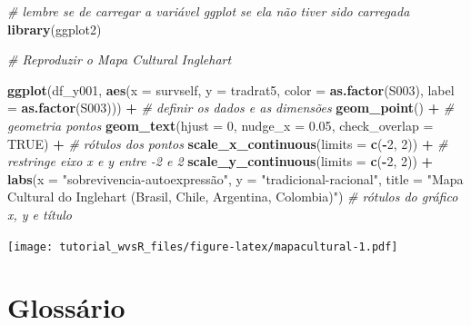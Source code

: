 \documentclass[
  10pt,
  brazil,
  a4paper,
  twoside, notitlepage, openright]{book}
\newenvironment{Shaded}{\begin{snugshade}}{\end{snugshade}}
\newcommand{\CommentTok}[1]{\textcolor[rgb]{0.56,0.35,0.01}{\textit{#1}}}
\newcommand{\DataTypeTok}[1]{\textcolor[rgb]{0.13,0.29,0.53}{#1}}
\newcommand{\DecValTok}[1]{\textcolor[rgb]{0.00,0.00,0.81}{#1}}
\newcommand{\FloatTok}[1]{\textcolor[rgb]{0.00,0.00,0.81}{#1}}
\newcommand{\KeywordTok}[1]{\textcolor[rgb]{0.13,0.29,0.53}{\textbf{#1}}}
\newcommand{\NormalTok}[1]{#1}
\newcommand{\OperatorTok}[1]{\textcolor[rgb]{0.81,0.36,0.00}{\textbf{#1}}}
\newcommand{\OtherTok}[1]{\textcolor[rgb]{0.56,0.35,0.01}{#1}}
\newcommand{\StringTok}[1]{\textcolor[rgb]{0.31,0.60,0.02}{#1}}
\begin{document}
\begin{Shaded}
\begin{Highlighting}[]
\CommentTok{# lembre se de carregar a variável ggplot se ela não tiver sido carregada }
\KeywordTok{library}\NormalTok{(ggplot2)}

\CommentTok{# Reproduzir o Mapa Cultural Inglehart}

\KeywordTok{ggplot}\NormalTok{(df_y001, }\KeywordTok{aes}\NormalTok{(}\DataTypeTok{x =}\NormalTok{ survself, }
                    \DataTypeTok{y =}\NormalTok{ tradrat5, }
                    \DataTypeTok{color =} \KeywordTok{as.factor}\NormalTok{(S003), }
                    \DataTypeTok{label =} \KeywordTok{as.factor}\NormalTok{(S003))) }\OperatorTok{+}\StringTok{ }
\StringTok{  }\CommentTok{# definir os dados e as dimensões}
\StringTok{  }\KeywordTok{geom_point}\NormalTok{() }\OperatorTok{+}\StringTok{ }\CommentTok{# geometria pontos}
\StringTok{  }\KeywordTok{geom_text}\NormalTok{(}\DataTypeTok{hjust =} \DecValTok{0}\NormalTok{, }\DataTypeTok{nudge_x =} \FloatTok{0.05}\NormalTok{, }\DataTypeTok{check_overlap =} \OtherTok{TRUE}\NormalTok{) }\OperatorTok{+}\StringTok{ }\CommentTok{# rótulos dos pontos}
\StringTok{  }\KeywordTok{scale_x_continuous}\NormalTok{(}\DataTypeTok{limits =} \KeywordTok{c}\NormalTok{(}\OperatorTok{-}\DecValTok{2}\NormalTok{, }\DecValTok{2}\NormalTok{)) }\OperatorTok{+}\StringTok{ }\CommentTok{# restringe eixo x e y entre -2 e 2}
\StringTok{  }\KeywordTok{scale_y_continuous}\NormalTok{(}\DataTypeTok{limits =} \KeywordTok{c}\NormalTok{(}\OperatorTok{-}\DecValTok{2}\NormalTok{, }\DecValTok{2}\NormalTok{)) }\OperatorTok{+}
\StringTok{  }\KeywordTok{labs}\NormalTok{(}\DataTypeTok{x =} \StringTok{"sobrevivencia-autoexpressão"}\NormalTok{,}
       \DataTypeTok{y =} \StringTok{"tradicional-racional"}\NormalTok{,}
       \DataTypeTok{title =} \StringTok{"Mapa Cultural do Inglehart (Brasil, Chile, Argentina, Colombia)"}\NormalTok{) }\CommentTok{# rótulos do gráfico x, y e título}
\end{Highlighting}
\end{Shaded}

\texttt{[image: tutorial\_wvsR\_files/figure-latex/mapacultural-1.pdf]}

\hypertarget{glossuxe1rio}{%
\chapter{Glossário}\label{glossuxe1rio}}
\end{document}
